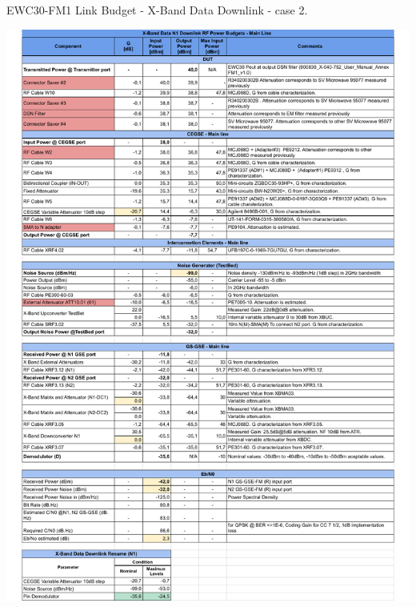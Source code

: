 \begin{table}[H]
	\centering
	\caption{EWC30-FM1 Link Budget - X-Band Data Downlink - case 2.} \label{tb:Data_EBN0FM1}
	\includegraphics[page=1, scale=0.75, trim=0cm -0.3cm 0cm 0cm, clip ]
	{tables/Ensayos COMM-SS Link Budget -EBN0 X-Band Data N1 Downlink.pdf}\\
\end{table}

